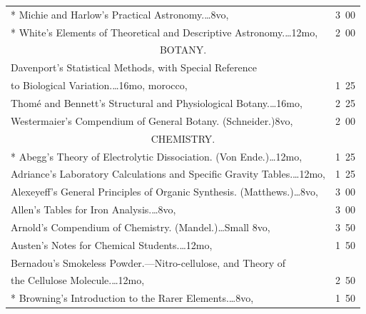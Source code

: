 \documentclass[a4paper,12pt]{book}[2004/02/16]
\providecommand{\colorbox}[2]{#2}
\newcommand{\correction}[2]{\colorbox{corr}{#1}}
\theoremstyle{ilemma}
\theoremstyle{itheorem}
\theoremstyle{iother}
\theoremstyle{icorollary}
\theoremstyle{numcorollary}
\theoremstyle{idefinition}
\begin{document}
\begin{longtable}{@{}l@{ }r@{}}
* Michie and Harlow's Practical Astronomy.\dotfill\ldots 8vo, &3\ 00\\

* White's Elements of Theoretical and Descriptive
  Astronomy.\dotfill\ldots 12mo, &\correction{2}{}\ 00\\[3em]

\multicolumn{2}{c}{\large BOTANY.}\\[1em]
\nopagebreak
Davenport's Statistical Methods, with Special Reference\\

\nopagebreak
\indent\indent to Biological Variation.\dotfill\ldots 16mo, morocco,
&1\ 25\\

Thom\'e and Bennett's Structural and Physiological
Botany.\dotfill\ldots 16mo, &2\ 25\\

Westermaier's Compendium of General Botany. (Schneider.)\dotfill 8vo,
&2\ 00\\[3em]
\multicolumn{2}{c}{\large CHEMISTRY.}\\[1em] \nopagebreak
* Abegg's Theory of Electrolytic Dissociation. (Von
Ende.)\dotfill\ldots 12mo, & 1\ 25 \\

Adriance's Laboratory Calculations and Specific Gravity
Tables.\dotfill\ldots 12mo, &1\ 25\\

Alexeyeff's General Principles of Organic
Synthesis. (Matthews.)\dotfill\ldots 8vo, &3\ 00\\

Allen's Tables for Iron Analysis.\dotfill\ldots 8vo, &3\ 00\\

Arnold's Compendium of Chemistry. (Mandel.)\dotfill\ldots Small 8vo,
&3\ 50\\

Austen's Notes for Chemical Students.\dotfill\ldots 12mo, &1\ 50\\

Bernadou's Smokeless Powder.---Nitro-cellulose, and Theory of\\

\nopagebreak
\indent\indent the Cellulose Molecule.\dotfill\ldots 12mo, &2\ 50\\

* Browning's Introduction to the Rarer Elements.\dotfill\ldots 8vo, &1\ 50\\


\end{longtable}
\end{document}
